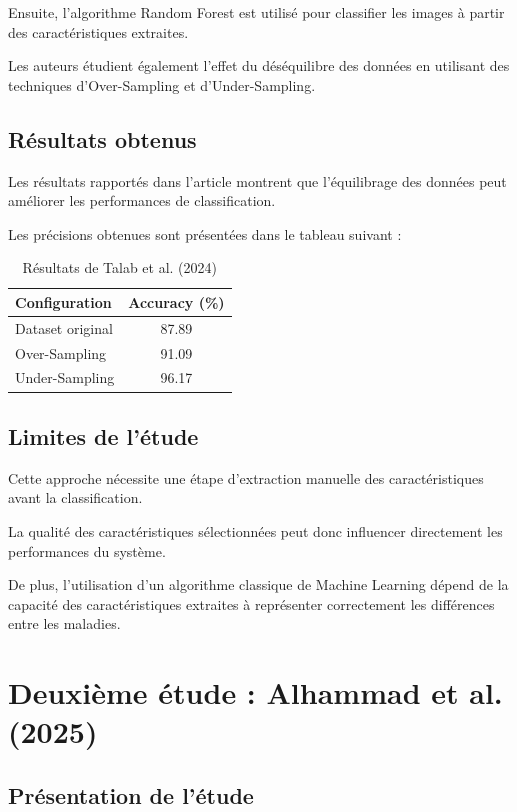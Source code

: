 \documentclass[12pt,a4paper,oneside]{report}
\begin{document}
Ensuite, l'algorithme Random Forest est utilisé pour
classifier les images à partir des caractéristiques extraites.

Les auteurs étudient également l'effet du déséquilibre
des données en utilisant des techniques d'Over-Sampling
et d'Under-Sampling.

\subsection{Résultats obtenus}

Les résultats rapportés dans l'article montrent que
l'équilibrage des données peut améliorer les performances
de classification.

Les précisions obtenues sont présentées dans le tableau
suivant :

\begin{table}[H]
\centering
\caption{Résultats de Talab et al. (2024)}
\begin{tabular}{lc}
\toprule
\textbf{Configuration} & \textbf{Accuracy (\%)}\\
\midrule
Dataset original & 87.89\\
Over-Sampling & 91.09\\
Under-Sampling & 96.17\\
\bottomrule
\end{tabular}
\end{table}

\subsection{Limites de l'étude}

Cette approche nécessite une étape d'extraction manuelle
des caractéristiques avant la classification.

La qualité des caractéristiques sélectionnées peut donc
influencer directement les performances du système.

De plus, l'utilisation d'un algorithme classique de
Machine Learning dépend de la capacité des caractéristiques
extraites à représenter correctement les différences
entre les maladies.

\section{Deuxième étude : Alhammad et al. (2025)}

\subsection{Présentation de l'étude}
\end{document}
